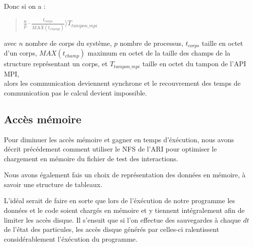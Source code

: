 \par Donc si on a :
\begin{quote}
  \begin{center}
    $\frac{n}{p}\cdot \frac{t_{corps}}{MAX(t_{champ})} \rangle T_{tampon\_mpi}$    
  \end{center}
\end{quote}
avec $n$ nombre de corps du système, $p$ nombre de processus, $t_{corps}$ taille en octet d'un corps,
$MAX(t_{champ})$ maximum en octet de la taille des champs de la structure représentant un corps,
et $T_{tampon\_mpi}$ taille en octet du tampon de l'API MPI,\\
alors les communication deviennent synchrone et le recouvrement des temps de communication pas le calcul devient 
impossible.\\

\subsection{Accès mémoire}

\par Pour diminuer les accès mémoire et gagner en temps d'éxécution, nous avons décrit précédement
comment utiliser le NFS de l'ARI pour optimiser le chargement en mémoire du fichier de test
des interactions.\\

\par Nous avons également fais un choix de représentation des données en mémoire, à savoir une structure 
de tableaux.\\

\par L'idéal serait de faire en sorte que lors de l'éxécution de notre programme les données et le code 
soient chargés en mémoire et y tiennent intégralement afin de limiter les accès disque.
Il s'ensuit que si l'on effectue des sauvegardes à chaque $dt$ de l'état des particules, les 
accès disque générés par celles-ci ralentissent considérablement l'éxécution du programme.\\

